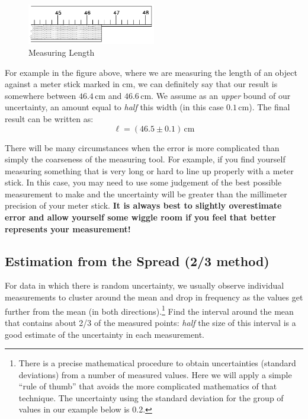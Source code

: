\documentclass[letterpaper, 12pt]{book}
\newcommand{\myskip}{\vspace{0.5\baselineskip}}
\begin{document}
\begin{figure}[h]
    \begin{center}
        \includegraphics[width=0.5\textwidth]{./pic/image1.png}
    \end{center}
    \caption{Measuring Length}
    \label{fig:measure}
\end{figure}

For example in the figure above, where we are measuring the length of an object against a meter stick marked in cm, we can definitely say that our result is somewhere between $46.4\,\mathrm{cm}$ and $46.6\,\mathrm{cm}$. We assume as an \emph{upper} bound of our uncertainty, an amount equal to \emph{half} this width (in this case $0.1\,\mathrm{cm}$). The final result can be written as:
\begin{equation}
    \ell = (46.5\pm 0.1)\,\mathrm{cm}
\end{equation}

There will be many circumstances when the error is more complicated than simply the coarseness of the measuring tool. For example, if you find yourself measuring something that is very long or hard to line up properly with a meter stick. In this case, you may need to use some judgement of the best possible measurement to make and the uncertainty will be greater than the millimeter precision of your meter stick. \textbf{It is always best to slightly overestimate error and allow yourself some wiggle room if you feel that better represents your measurement!}

\subsection{Estimation from the Spread (2/3 method)} \label{ssec:twothirds}

For data in which there is random uncertainty, we usually observe individual measurements to cluster around the mean and drop in frequency as the values get further from the mean (in both directions).\footnote{There is a precise mathematical procedure to obtain uncertainties (standard deviations) from a number of measured values. Here we will apply a simple ``rule of thumb'' that avoids the more complicated mathematics of that technique. The uncertainty using the standard deviation for the group of values in our example below is 0.2.}  Find the interval around the mean that contains about 2/3 of the measured points: \emph{half} the size of this interval is a good estimate of the uncertainty in each measurement. \myskip
\end{document}
